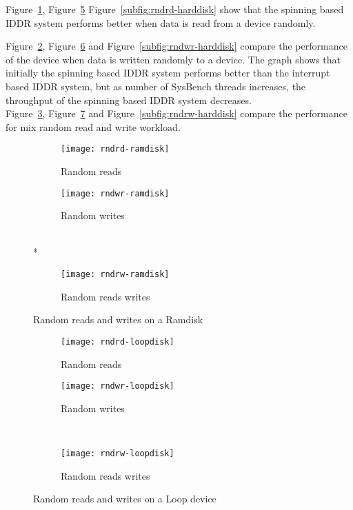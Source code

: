 Figure~\ref{subfig:rndrd-ramdisk}, Figure~\ref{subfig:rndrd-loopdisk} Figure~\ref{subfig:rndrd-harddisk} show that the spinning based IDDR system performs better when data is read from a device randomly.  

Figure~\ref{subfig:rndwr-ramdisk}, Figure~\ref{subfig:rndwr-loopdisk} and Figure~\ref{subfig:rndwr-harddisk} compare the performance of the device when data is written randomly to a device. The graph shows that initially the spinning based IDDR system performs better than the interrupt based IDDR system, but as number of SysBench threads increases, the throughput of the spinning based IDDR system decreases.
\\[3mm] 
Figure~\ref{subfig:rndrw-ramdisk}, Figure~\ref{subfig:rndrw-loopdisk} and Figure~\ref{subfig:rndrw-harddisk} compare the performance for mix random read and write workload. 

\begin{figure}[!ht]
  \begin{subfigure}[b]{0.2\textwidth}
  \texttt{[image: rndrd-ramdisk]}
  \caption{Random reads}
  \label{subfig:rndrd-ramdisk}
  \end{subfigure}
  \hspace{50mm}
  \begin{subfigure}[b]{0.2\textwidth}
  \texttt{[image: rndwr-ramdisk]}
  \caption{Random writes}
  \label{subfig:rndwr-ramdisk}
  \end{subfigure}\\*
  \hspace{150mm}
  \begin{subfigure}[b]{0.3\textwidth}
  \texttt{[image: rndrw-ramdisk]}
  \caption{Random reads writes}
  \label{subfig:rndrw-ramdisk}
  \end{subfigure}
  \caption{Random reads and writes on a Ramdisk}\label{fig:rndramdisk}
\end{figure}

\begin{figure}[!ht]
  \begin{subfigure}[b]{0.2\textwidth}
  \texttt{[image: rndrd-loopdisk]}
  \caption{Random reads}
  \label{subfig:rndrd-loopdisk}
  \end{subfigure}
  \hspace{50mm}
  \begin{subfigure}[b]{0.2\textwidth}
  \texttt{[image: rndwr-loopdisk]}
  \caption{Random writes}
  \label{subfig:rndwr-loopdisk}
  \end{subfigure}\\
  \begin{subfigure}[b]{0.3\textwidth}
  \texttt{[image: rndrw-loopdisk]}
  \caption{Random reads writes}
  \label{subfig:rndrw-loopdisk}
  \end{subfigure}
\caption{Random reads and writes on a Loop device}\label{fig:rndloopdisk}
\end{figure}

